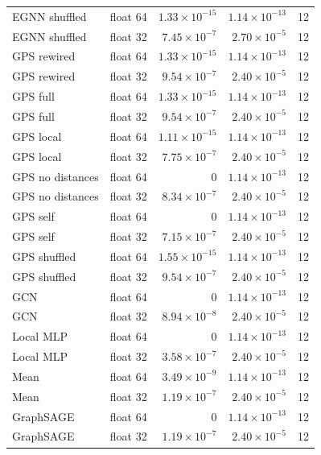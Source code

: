 \begin{longtable}{@{}llrrr@{}}
EGNN shuffled & float 64 & $1.33\times 10^{-15}$ & $1.14\times 10^{-13}$ & 12 \\
EGNN shuffled & float 32 & $7.45\times 10^{-7}$ & $2.70\times 10^{-5}$ & 12 \\
GPS rewired & float 64 & $1.33\times 10^{-15}$ & $1.14\times 10^{-13}$ & 12 \\
GPS rewired & float 32 & $9.54\times 10^{-7}$ & $2.40\times 10^{-5}$ & 12 \\
GPS full & float 64 & $1.33\times 10^{-15}$ & $1.14\times 10^{-13}$ & 12 \\
GPS full & float 32 & $9.54\times 10^{-7}$ & $2.40\times 10^{-5}$ & 12 \\
GPS local & float 64 & $1.11\times 10^{-15}$ & $1.14\times 10^{-13}$ & 12 \\
GPS local & float 32 & $7.75\times 10^{-7}$ & $2.40\times 10^{-5}$ & 12 \\
GPS no distances & float 64 & 0 & $1.14\times 10^{-13}$ & 12 \\
GPS no distances & float 32 & $8.34\times 10^{-7}$ & $2.40\times 10^{-5}$ & 12 \\
GPS self & float 64 & 0 & $1.14\times 10^{-13}$ & 12 \\
GPS self & float 32 & $7.15\times 10^{-7}$ & $2.40\times 10^{-5}$ & 12 \\
GPS shuffled & float 64 & $1.55\times 10^{-15}$ & $1.14\times 10^{-13}$ & 12 \\
GPS shuffled & float 32 & $9.54\times 10^{-7}$ & $2.40\times 10^{-5}$ & 12 \\
GCN & float 64 & 0 & $1.14\times 10^{-13}$ & 12 \\
GCN & float 32 & $8.94\times 10^{-8}$ & $2.40\times 10^{-5}$ & 12 \\
Local MLP & float 64 & 0 & $1.14\times 10^{-13}$ & 12 \\
Local MLP & float 32 & $3.58\times 10^{-7}$ & $2.40\times 10^{-5}$ & 12 \\
Mean & float 64 & $3.49\times 10^{-9}$ & $1.14\times 10^{-13}$ & 12 \\
Mean & float 32 & $1.19\times 10^{-7}$ & $2.40\times 10^{-5}$ & 12 \\
GraphSAGE & float 64 & 0 & $1.14\times 10^{-13}$ & 12 \\
GraphSAGE & float 32 & $1.19\times 10^{-7}$ & $2.40\times 10^{-5}$ & 12 \\\bottomrule\end{longtable}

